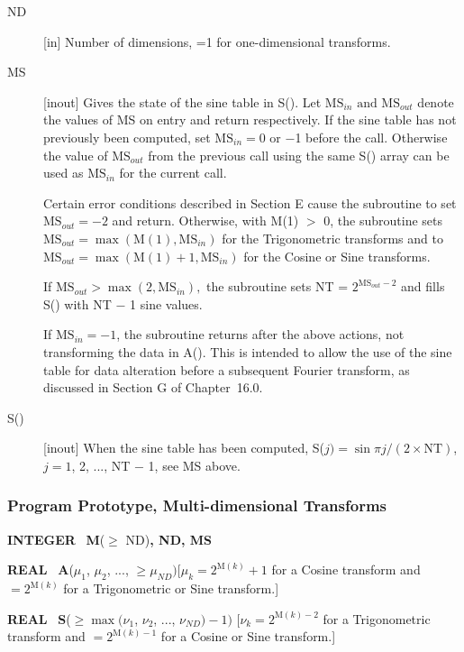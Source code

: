 \documentclass[twoside]{MATH77}
\begin{document}
\begin{description}
\item[ND]  [in] Number of dimensions, =1 for one-dimensional transforms.

\item[MS]  [inout] Gives the state of the sine table in S().  Let
$\text{MS}_{in}\text{ and MS}_{out}$ denote the values of MS on entry
and return respectively. If the sine table has not previously been
computed, set $\text{MS}_{in} = 0$ or $-$1 before the call. Otherwise
the value of $\text{MS}_{out}$ from the previous call using the same
S() array can be used as $\text{MS}_{in}$ for the current call.

Certain error conditions described in Section E cause the subroutine
to set $\text{MS}_{out} = -2$ and return.  Otherwise, with M(1) $>$ 0, the
subroutine sets $\text{MS}_{out} = \max (\text{M}(1), \text{MS}_{in})$
for the Trigonometric transforms and to $\text{MS}_{out} = \max
(\text{M}(1)+1, \text{MS}_{in})$ for the Cosine or Sine transforms.

If $\text{MS}_{out} > \max (2, \text{MS}_{in}),$ the subroutine sets
NT = $2^{\text{MS}_{out}-2}$ and fills S() with NT $-$ 1 sine values.

If $\text{MS}_{in}=-1$, the subroutine returns after the above
actions, not transforming the data in A().  This is intended to allow
the use of the sine table for data alteration before a subsequent Fourier
transform, as discussed in Section G of Chapter~16.0.

\item[S()]  [inout] When the sine table has been computed, S($j)=\sin \pi
j/(2\times \text{NT})$, $j=1$, 2, ..., NT $-$ 1, see MS above.
\end{description}

\subsubsection{Program Prototype, Multi-dimensional Transforms}

{\bf INTEGER} \ {\bf M}($\geq $ ND){\bf , ND, MS}

{\bf REAL} \ {\bf A}($\mu _1$, $\mu _2$, ..., $\geq \mu _{ND})$\quad $[\mu
_k=2^{\text{M}(k)}+1$ for a Cosine transform and $=2^{\text{M}(k)}$ for a
Trigonometric or Sine transform.]

{\bf REAL} \ {\bf S}($\geq \max (\nu _1$, $\nu _2$, ..., $\nu _{ND})-1)$%
\quad $[\nu _k=2^{\text{M}(k)-2}$ for a Trigonometric transform
and $=2^{\text{M}(k)-1}$
for a Cosine or Sine transform.]
\end{document}
